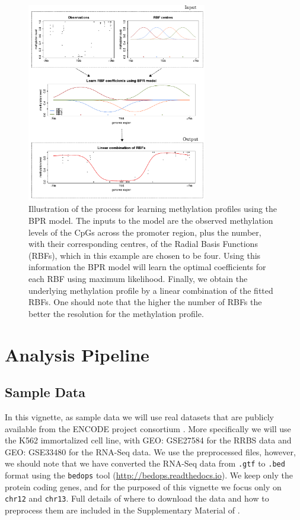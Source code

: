 \documentclass{article}\usepackage[]{graphicx}\usepackage[usenames,dvipsnames]{color}
\begin{document}
\begin{figure}[!ht]
\centerline{\includegraphics[width=0.70\textwidth]{model-bpr}}
\caption{\small{Illustration of the process for learning methylation profiles using the BPR model. The inputs to the model are the observed methylation levels of the CpGs across the promoter region, plus the number, with their corresponding centres, of the Radial Basis Functions (RBFs), which in this example are chosen to be four. Using this information the BPR model will learn the optimal coefficients for each RBF using maximum likelihood. Finally, we obtain the underlying methylation profile by a linear combination of the fitted RBFs. One should note that the higher the number of RBFs the better the resolution for the methylation profile.}}
\label{fig:model-performance}
\end{figure}

\section{Analysis Pipeline}
\subsection{Sample Data}
In this vignette, as sample data we will use real datasets that are publicly available from the ENCODE project consortium \cite{Dunham2012}. More specifically we will use the K562 immortalized cell line, with GEO: GSE27584 for the RRBS data and GEO: GSE33480 for the RNA-Seq data. We use the preprocessed files, however, we should note that we have converted the RNA-Seq data from \verb|.gtf| to \verb|.bed| format using the \verb|bedops| tool (\href{http://bedops.readthedocs.io} {http://bedops.readthedocs.io}). We keep only the protein coding genes, and for the purposed of this vignette we focus only on \verb|chr12| and \verb|chr13|. Full details of where to download the data and how to preprocess them are included in the Supplementary Material of \cite{Kapourani2016}.
\end{document}

